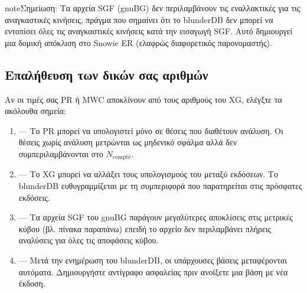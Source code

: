 \documentclass[letterpaper,10pt,greek]{sphinxmanual}
\begin{document}
\begin{sphinxadmonition}{note}{Σημείωση:}
\sphinxAtStartPar
Τα αρχεία SGF (gnuBG) δεν περιλαμβάνουν τις εναλλακτικές για τις αναγκαστικές κινήσεις, πράγμα που σημαίνει ότι το blunderDB δεν μπορεί να εντοπίσει όλες τις αναγκαστικές κινήσεις κατά την εισαγωγή SGF. Αυτό δημιουργεί μια δομική απόκλιση στο Snowie ER (ελαφρώς διαφορετικός παρονομαστής).
\end{sphinxadmonition}


\subsection{Επαλήθευση των δικών σας αριθμών}
\label{\detokenize{stats_parity:valider-vos-propres-chiffres}}
\sphinxAtStartPar
Αν οι τιμές σας PR ή MWC αποκλίνουν από τους αριθμούς του XG, ελέγξτε τα ακόλουθα σημεία:
\begin{enumerate}
%
\item {} 
\sphinxAtStartPar
{} — Το PR μπορεί να υπολογιστεί μόνο σε θέσεις που διαθέτουν ανάλυση. Οι θέσεις χωρίς ανάλυση μετρώνται ως μηδενικό σφάλμα αλλά δεν συμπεριλαμβάνονται στο \(N_\text{compté}\).

\item {} 
\sphinxAtStartPar
{} — Το XG μπορεί να αλλάξει τους υπολογισμούς του μεταξύ εκδόσεων. Το blunderDB ευθυγραμμίζεται με τη συμπεριφορά που παρατηρείται στις πρόσφατες εκδόσεις.

\item {} 
\sphinxAtStartPar
{} — Τα αρχεία SGF του gnuBG παράγουν μεγαλύτερες αποκλίσεις στις μετρικές κύβου (βλ. πίνακα παραπάνω) επειδή το αρχείο δεν περιλαμβάνει πλήρεις αναλύσεις για όλες τις αποφάσεις κύβου.

\item {} 
\sphinxAtStartPar
{} — Μετά την ενημέρωση του blunderDB, οι υπάρχουσες βάσεις μεταφέρονται αυτόματα. Δημιουργήστε αντίγραφο ασφαλείας πριν ανοίξετε μια βάση με νέα έκδοση.

\end{enumerate}
\end{document}
